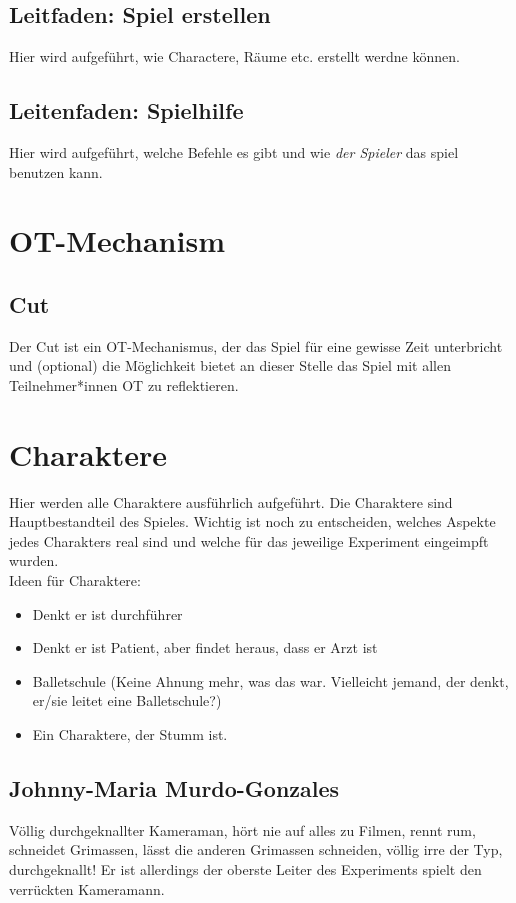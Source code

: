 \documentclass[a4paper, 12pt]{scrartcl}
\begin{document}
    
    \subsection{Leitfaden: Spiel erstellen}
    Hier wird aufgeführt, wie Charactere, Räume etc. erstellt werdne können.
    
    \subsection{Leitenfaden: Spielhilfe}
    Hier wird aufgeführt, welche Befehle es gibt und wie \textit{der Spieler} das spiel benutzen kann.

    \section{OT-Mechanism}
    \subsection{Cut} \label{cut}
    Der Cut ist ein OT-Mechanismus, der das Spiel für eine gewisse Zeit unterbricht und (optional) die Möglichkeit bietet an dieser Stelle das Spiel mit allen Teilnehmer*innen OT zu reflektieren. 

    \section{Charaktere}
    Hier werden alle Charaktere ausführlich aufgeführt. Die Charaktere sind Hauptbestandteil des Spieles. Wichtig ist noch zu entscheiden, welches Aspekte jedes Charakters \glqq real\grqq{} sind und welche für das jeweilige Experiment \glqq eingeimpft\grqq{} wurden.\\
    Ideen für Charaktere:
    \begin{itemize}
    \item Denkt er ist durchführer
    \item Denkt er ist Patient, aber findet heraus, dass er Arzt ist
    \item Balletschule (Keine Ahnung mehr, was das war. Vielleicht jemand, der denkt, er/sie leitet eine Balletschule?)
    \item Ein Charaktere, der Stumm ist.
    \end{itemize}

    \subsection{Johnny-Maria Murdo-Gonzales}
    Völlig durchgeknallter Kameraman, hört nie auf alles zu Filmen, rennt rum, schneidet Grimassen, lässt die anderen Grimassen schneiden, völlig irre der Typ, durchgeknallt! 
    Er ist allerdings der oberste Leiter des Experiments \glqq spielt\grqq{} den verrückten Kameramann. 
    
\end{document}
